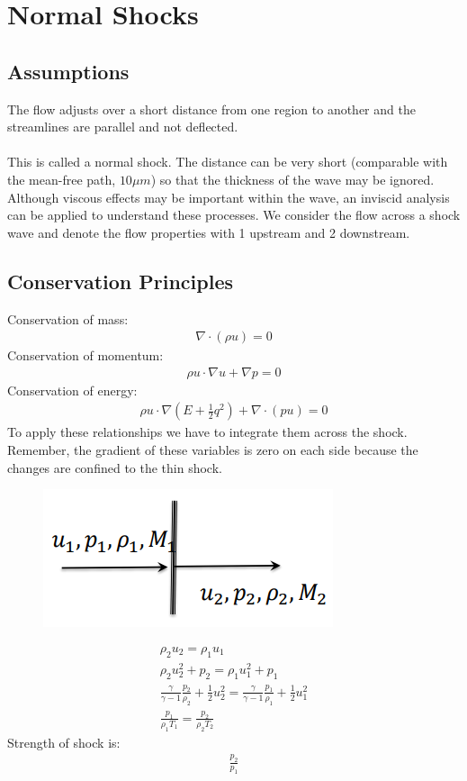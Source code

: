 \documentclass[class=report, crop=false, 12pt,a4paper]{standalone}
\begin{document}
\section{Normal Shocks}
\subsection{Assumptions}
The flow adjusts over a short distance from one region to another and the streamlines are parallel and not deflected.
\\\\
This is called a normal shock. The distance can be very short (comparable with the mean-free path, $10 \mu m$) so that the thickness of the wave may be ignored. Although viscous effects may be important within the wave, an inviscid analysis can be applied to understand these processes. We consider the flow across a shock wave and denote the flow properties with 1 upstream and 2 downstream.
\subsection{Conservation Principles}
Conservation of mass: 
\begin{gather}
    \nabla \cdot (\rho u) = 0
\end{gather}
Conservation of momentum: 
\begin{gather}
    \rho u \cdot \nabla u + \nabla p = 0
\end{gather}
Conservation of energy: 
\begin{gather}
    \rho u \cdot \nabla \left( E + \frac{1}{2}q^2 \right) + \nabla \cdot (pu) = 0
\end{gather}
To apply these relationships we have to integrate them across the shock. Remember, the gradient of these variables is zero on each side because the changes are confined to the thin shock. 
\begin{figure}[H]
    \centering
    \includegraphics[width = 0.5 \textwidth]{../img/diagram4.PNG} 
    \caption{}
\end{figure}
\begin{gather}
    \rho_2 u_2 = \rho_1 u_1 \\[5pt]
    \rho_2 u_2^2 + p_2 = \rho_1 u_1^2 + p_1 \\[5pt]
    \frac{\gamma}{\gamma - 1} \frac{p_2}{\rho_2} + \frac{1}{2}u_2^2 = \frac{\gamma}{\gamma - 1} \frac{p_1}{\rho_1} + \frac{1}{2}u_1^2 \\[5pt]
    \frac{p_1}{\rho_1 T_1} = \frac{p_2}{\rho_2 T_2}
\end{gather}
Strength of shock is: 
\begin{gather}
    \frac{p_2}{p_1}
\end{gather}
\end{document}
